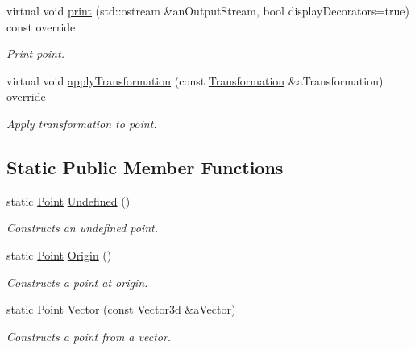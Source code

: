\begin{DoxyCompactItemize}
virtual void \hyperlink{classlibrary_1_1math_1_1geom_1_1d3_1_1objects_1_1_point_a76847422ebfcc28388d1b0427a5cb1de}{print} (std\+::ostream \&an\+Output\+Stream, bool display\+Decorators=true) const override
\begin{DoxyCompactList}\small\item\em Print point. \end{DoxyCompactList}\item 
virtual void \hyperlink{classlibrary_1_1math_1_1geom_1_1d3_1_1objects_1_1_point_ad2052f6ef5df88b75cae09c58a678f95}{apply\+Transformation} (const \hyperlink{classlibrary_1_1math_1_1geom_1_1d3_1_1_transformation}{Transformation} \&a\+Transformation) override
\begin{DoxyCompactList}\small\item\em Apply transformation to point. \end{DoxyCompactList}\end{DoxyCompactItemize}
\subsection*{Static Public Member Functions}
\begin{DoxyCompactItemize}
\item 
static \hyperlink{classlibrary_1_1math_1_1geom_1_1d3_1_1objects_1_1_point}{Point} \hyperlink{classlibrary_1_1math_1_1geom_1_1d3_1_1objects_1_1_point_a7c4c9c71f9b29b85925d8a7ed4943501}{Undefined} ()
\begin{DoxyCompactList}\small\item\em Constructs an undefined point. \end{DoxyCompactList}\item 
static \hyperlink{classlibrary_1_1math_1_1geom_1_1d3_1_1objects_1_1_point}{Point} \hyperlink{classlibrary_1_1math_1_1geom_1_1d3_1_1objects_1_1_point_ab2a38e285c562e50bf350272c083986f}{Origin} ()
\begin{DoxyCompactList}\small\item\em Constructs a point at origin. \end{DoxyCompactList}\item 
static \hyperlink{classlibrary_1_1math_1_1geom_1_1d3_1_1objects_1_1_point}{Point} \hyperlink{classlibrary_1_1math_1_1geom_1_1d3_1_1objects_1_1_point_a399551f0293c17de16fedb3e526cee04}{Vector} (const Vector3d \&a\+Vector)
\begin{DoxyCompactList}\small\item\em Constructs a point from a vector. \end{DoxyCompactList}\end{DoxyCompactItemize}


